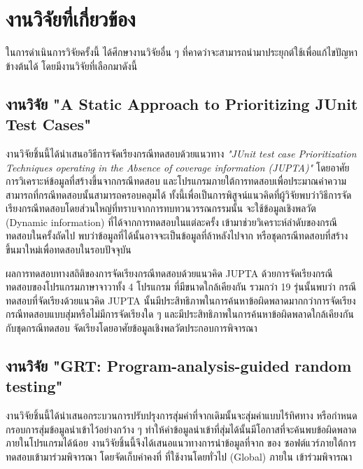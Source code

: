 \section{งานวิจัยที่เกี่ยวข้อง} 

ในการดำเนินการวิจัยครั้งนี้ ได้ศึกษางานวิจัยอื่น ๆ ที่คาดว่าจะสามารถนำมาประยุกต์ใช้เพื่อแก้ไขปัญหาข้างต้นได้ โดยมีงานวิจัยที่เลือกมาดังนี้

\subsection{งานวิจัย "A Static Approach to Prioritizing JUnit Test Cases" \cite{6363461}}

งานวิจัยชิ้นนี้ได้นำเสนอวิธีการจัดเรียงกรณีทดสอบด้วยแนวทาง \emph{"JUnit test case Prioritization Techniques operating in the Absence of coverage information (JUPTA)"} 
โดยอาศัยการวิเคราะห์ข้อมูล{\scg}ที่สร้างขึ้นจากกรณีทดสอบ และโปรแกรมภายใต้การทดสอบเพื่อประมาณค่าความสามารถที่กรณีทดสอบนั้นสามารถครอบคลุม{\sourcecode}ได้
ทั้งนี้เพื่อเป็นการพิสูจน์แนวคิดที่ผู้วิจัยพบว่าวิธีการจัดเรียงกรณีทดสอบโดยส่วนใหญ่ที่ทราบจากการทบทวนวรรณกรรมนั้น จะใช้ข้อมูลเชิงพลวัต (Dynamic information)
ที่ได้จากการทดสอบ{\sourcecode}ในแต่ละครั้ง เข้ามาช่วยวิเคราะห์ลำดับของกรณีทดสอบในครั้งถัดไป พบว่าข้อมูลที่ได้นั้นอาจจะเป็นข้อมูลที่ล้าหลังไปจาก{\sourcecode} 
หรือชุดกรณีทดสอบที่สร้างขึ้นมาใหม่เพื่อทดสอบในรอบปัจจุบัน 

ผลการทดสอบทางสถิติของการจัดเรียงกรณีทดสอบด้วยแนวคิด JUPTA ด้วยการจัดเรียงกรณีทดสอบของโปรแกรมภาษาจาวาทั้ง 4 โปรแกรม ที่มีขนาดใกล้เคียงกัน
รวมกว่า 19 รุ่นนั้นพบว่า กรณีทดสอบที่จัดเรียงด้วยแนวคิด JUPTA นั้นมีประสิทธิภาพในการค้นหาข้อผิดพลาดมากกว่าการจัดเรียงกรณีทดสอบแบบสุ่มหรือไม่มีการจัดเรียงใด ๆ 
และมีประสิทธิภาพในการค้นหาข้อผิดพลาดใกล้เคียงกันกับชุดกรณีทดสอบ จัดเรียงโดยอาศัยข้อมูลเชิงพลวัตประกอบการพิจารณา

\subsection{งานวิจัย "GRT: Program-analysis-guided random testing" \cite{Ma2016}}

งานวิจัยชิ้นนี้ได้นำเสนอกระบวนการปรับปรุงการสุ่มค่าที่จากเดิมนั้นจะสุ่มค่าแบบไร้ทิศทาง หรือกำหนดกรอบการสุ่มข้อมูลนำเข้าไว้อย่างกว้าง ๆ 
ทำให้ค่าข้อมูลนำเข้าที่สุ่มได้นั้นมีโอกาสที่จะค้นพบข้อผิดพลาดภายในโปรแกรมได้น้อย งานวิจัยชิ้นนี้จึงได้เสนอแนวทางการนำข้อมูลที่จาก{\sourcecode} ของ
ซอฟต์แวร์ภายใต้การทดสอบเข้ามาร่วมพิจารณา โดยจัดเก็บค่าคงที่ ที่ใช้งานโดยทั่วไป (Global) ภายใน{\sourcecode} เข้าร่วมพิจารณา 

